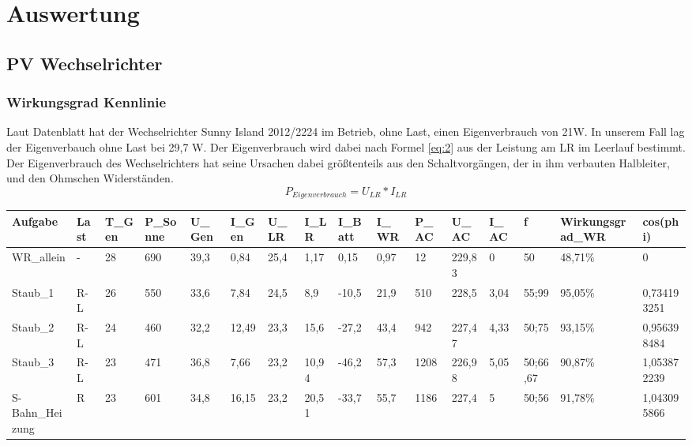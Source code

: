 \section{Auswertung}
\subsection{PV Wechselrichter}
\subsubsection{Wirkungsgrad Kennlinie}
Laut Datenblatt hat der Wechselrichter Sunny Island 2012/2224 im Betrieb, ohne Last, einen Eigenverbrauch von 21W. In unserem Fall lag der Eigenverbauch ohne Last bei 29,7 W. Der Eigenverbrauch wird dabei nach Formel \ref{eq:2} aus der Leistung am LR im Leerlauf bestimmt. Der Eigenverbrauch des Wechselrichters hat seine Ursachen dabei größtenteils aus den Schaltvorgängen, der in ihm verbauten Halbleiter, und den Ohmschen Widerständen.
%
\begin{equation}
	P_{ Eigenverbrauch }= U_{ LR} * I_{ LR }
\label{eq:2}
\end{equation}
%
\begin{table}[!ht]
    \centering
    \begin{tabular}{|l|l|l|l|l|l|l|l|l|l|l|l|l|l|l|l|}
    \hline
        Aufgabe & Last & T\_Gen & P\_Sonne & U\_Gen & I\_Gen & U\_LR & I\_LR & I\_Batt & I\_WR & P\_AC & U\_AC & I\_AC & f & Wirkungsgrad\_WR & cos(phi) \\ \hline
        WR\_allein & - & 28 & 690 & 39,3 & 0,84 & 25,4 & 1,17 & 0,15 & 0,97 & 12 & 229,83 & 0 & 50 & 48,71\% & 0 \\ \hline
        Staub\_1 & R-L & 26 & 550 & 33,6 & 7,84 & 24,5 & 8,9 & -10,5 & 21,9 & 510 & 228,5 & 3,04 & 55;99 & 95,05\% & 0,734193251 \\ \hline
        Staub\_2 & R-L & 24 & 460 & 32,2 & 12,49 & 23,3 & 15,6 & -27,2 & 43,4 & 942 & 227,47 & 4,33 & 50;75 & 93,15\% & 0,956398484 \\ \hline
        Staub\_3 & R-L & 23 & 471 & 36,8 & 7,66 & 23,2 & 10,94 & -46,2 & 57,3 & 1208 & 226,98 & 5,05 & 50;66,67 & 90,87\% & 1,053872239 \\ \hline
        S-Bahn\_Heizung & R & 23 & 601 & 34,8 & 16,15 & 23,2 & 20,51 & -33,7 & 55,7 & 1186 & 227,4 & 5 & 50;56 & 91,78\% & 1,043095866 \\ \hline

    \end{tabular}
\end{table}

